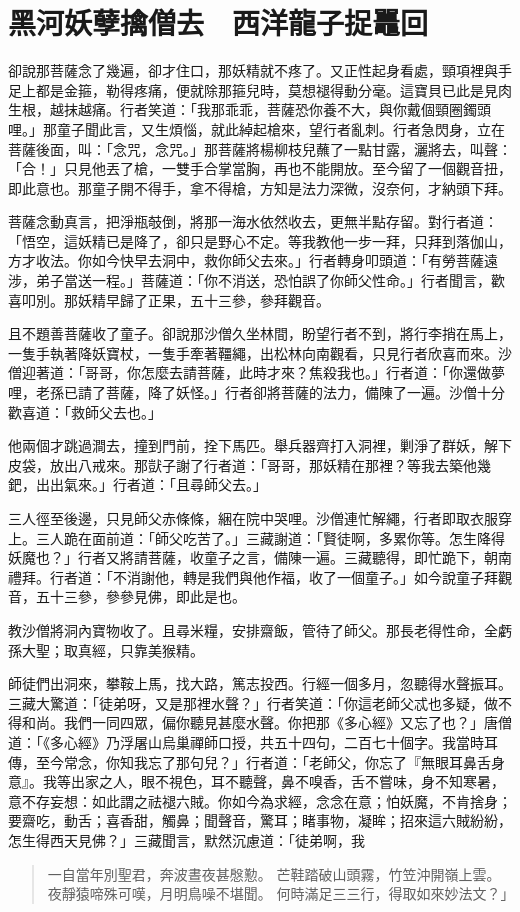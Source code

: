 
\chapter{黑河妖孽擒僧去　西洋龍子捉鼉回}

卻說那菩薩念了幾遍，卻才住口，那妖精就不疼了。又正性起身看處，頸項裡與手足上都是金箍，勒得疼痛，便就除那箍兒時，莫想褪得動分毫。這寶貝已此是見肉生根，越抹越痛。行者笑道：「我那乖乖，菩薩恐你養不大，與你戴個頸圈鐲頭哩。」那童子聞此言，又生煩惱，就此綽起槍來，望行者亂刺。行者急閃身，立在菩薩後面，叫：「念咒，念咒。」那菩薩將楊柳枝兒蘸了一點甘露，灑將去，叫聲：「合！」只見他丟了槍，一雙手合掌當胸，再也不能開放。至今留了一個觀音扭，即此意也。那童子開不得手，拿不得槍，方知是法力深微，沒奈何，才納頭下拜。

菩薩念動真言，把淨瓶攲倒，將那一海水依然收去，更無半點存留。對行者道：「悟空，這妖精已是降了，卻只是野心不定。等我教他一步一拜，只拜到落伽山，方才收法。你如今快早去洞中，救你師父去來。」行者轉身叩頭道：「有勞菩薩遠涉，弟子當送一程。」菩薩道：「你不消送，恐怕誤了你師父性命。」行者聞言，歡喜叩別。那妖精早歸了正果，五十三參，參拜觀音。

且不題善菩薩收了童子。卻說那沙僧久坐林間，盼望行者不到，將行李捎在馬上，一隻手執著降妖寶杖，一隻手牽著韁繩，出松林向南觀看，只見行者欣喜而來。沙僧迎著道：「哥哥，你怎麼去請菩薩，此時才來？焦殺我也。」行者道：「你還做夢哩，老孫已請了菩薩，降了妖怪。」行者卻將菩薩的法力，備陳了一遍。沙僧十分歡喜道：「救師父去也。」

他兩個才跳過澗去，撞到門前，拴下馬匹。舉兵器齊打入洞裡，剿淨了群妖，解下皮袋，放出八戒來。那獃子謝了行者道：「哥哥，那妖精在那裡？等我去築他幾鈀，出出氣來。」行者道：「且尋師父去。」

三人徑至後邊，只見師父赤條條，綑在院中哭哩。沙僧連忙解繩，行者即取衣服穿上。三人跪在面前道：「師父吃苦了。」三藏謝道：「賢徒啊，多累你等。怎生降得妖魔也？」行者又將請菩薩，收童子之言，備陳一遍。三藏聽得，即忙跪下，朝南禮拜。行者道：「不消謝他，轉是我們與他作福，收了一個童子。」如今說童子拜觀音，五十三參，參參見佛，即此是也。

教沙僧將洞內寶物收了。且尋米糧，安排齋飯，管待了師父。那長老得性命，全虧孫大聖；取真經，只靠美猴精。

師徒們出洞來，攀鞍上馬，找大路，篤志投西。行經一個多月，忽聽得水聲振耳。三藏大驚道：「徒弟呀，又是那裡水聲？」行者笑道：「你這老師父忒也多疑，做不得和尚。我們一同四眾，偏你聽見甚麼水聲。你把那《多心經》又忘了也？」唐僧道：「《多心經》乃浮屠山烏巢禪師口授，共五十四句，二百七十個字。我當時耳傳，至今常念，你知我忘了那句兒？」行者道：「老師父，你忘了『無眼耳鼻舌身意』。我等出家之人，眼不視色，耳不聽聲，鼻不嗅香，舌不嘗味，身不知寒暑，意不存妄想：如此謂之祛褪六賊。你如今為求經，念念在意；怕妖魔，不肯捨身；要齋吃，動舌；喜香甜，觸鼻；聞聲音，驚耳；睹事物，凝眸；招來這六賊紛紛，怎生得西天見佛？」三藏聞言，默然沉慮道：「徒弟啊，我
\begin{quote}
一自當年別聖君，奔波晝夜甚慇懃。
芒鞋踏破山頭霧，竹笠沖開嶺上雲。
夜靜猿啼殊可嘆，月明鳥噪不堪聞。
何時滿足三三行，得取如來妙法文？」
\end{quote}

